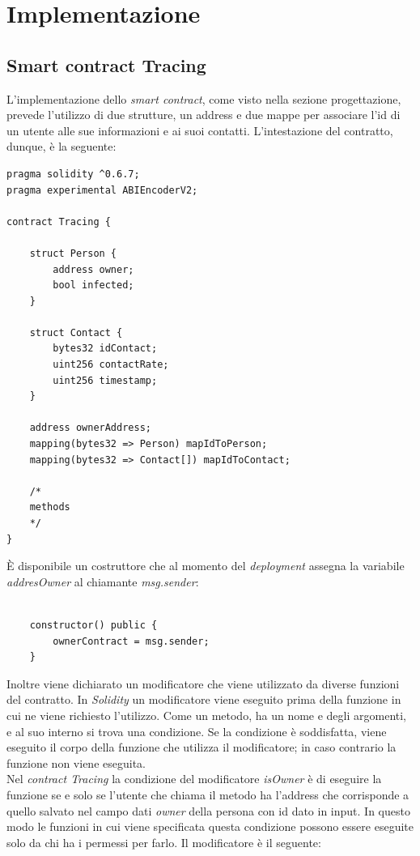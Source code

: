 \section{Implementazione}
\subsection{Smart contract Tracing}
L'implementazione dello \textit{smart contract}, come visto nella sezione progettazione, prevede l'utilizzo di due strutture, un address e due mappe per associare l'id di un utente alle sue informazioni e ai suoi contatti.
L'intestazione del contratto, dunque, è la seguente:

\mbox{\newline}
\begin{lstlisting}[language=Solidity]
pragma solidity ^0.6.7;
pragma experimental ABIEncoderV2;

contract Tracing {

    struct Person {
        address owner;
        bool infected;
    }

    struct Contact {
        bytes32 idContact;
        uint256 contactRate;
        uint256 timestamp;
    }
    
    address ownerAddress;
    mapping(bytes32 => Person) mapIdToPerson;
    mapping(bytes32 => Contact[]) mapIdToContact;

	/*
	methods
	*/
}

\end{lstlisting}
È disponibile un costruttore che al momento del \textit{deployment} assegna la variabile \textit{addresOwner} al chiamante \textit{msg.sender}:

\mbox{\newline}
\begin{lstlisting}[language = Solidity]

    constructor() public {
        ownerContract = msg.sender;
    }

\end{lstlisting}
\mbox{\newline}

Inoltre viene dichiarato un modificatore che viene utilizzato da diverse funzioni del contratto.
In \textit{Solidity} un modificatore viene eseguito prima della funzione in cui ne viene richiesto l'utilizzo. Come un metodo, ha un nome e degli argomenti, e al suo interno si trova una condizione. Se la condizione è soddisfatta, viene eseguito il corpo della funzione che utilizza il modificatore; in caso contrario la funzione non viene eseguita.\\
Nel \textit{contract Tracing} la condizione del modificatore \textit{isOwner} è di eseguire la funzione se e solo se l'utente che chiama il metodo ha l'address che corrisponde a quello salvato nel campo dati \textit{owner} della persona con id dato in input. In questo modo le funzioni in cui viene specificata questa condizione possono essere eseguite solo da chi ha i permessi per farlo. Il modificatore è il seguente:

